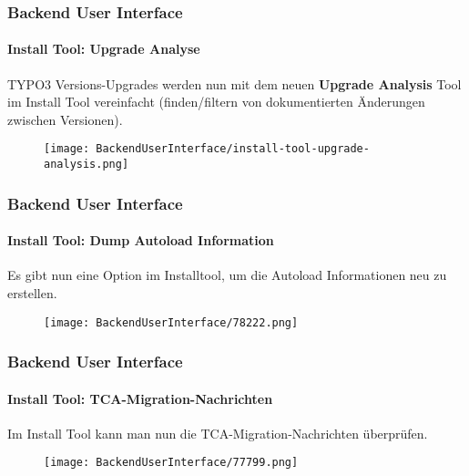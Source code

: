 \begin{frame}[fragile]
	\frametitle{Backend User Interface}
	\framesubtitle{Install Tool: Upgrade Analyse}

	TYPO3 Versions-Upgrades werden nun mit dem neuen  \textbf{Upgrade Analysis} Tool im Install Tool vereinfacht (finden/filtern von dokumentierten Änderungen zwischen Versionen).

	\begin{figure}
		\texttt{[image: BackendUserInterface/install-tool-upgrade-analysis.png]}
	\end{figure}

\end{frame}


\begin{frame}[fragile]
	\frametitle{Backend User Interface}
	\framesubtitle{Install Tool: Dump Autoload Information}

	Es gibt nun eine Option im Installtool, um die Autoload Informationen neu zu erstellen.

	\begin{figure}
		\texttt{[image: BackendUserInterface/78222.png]}
	\end{figure}

\end{frame}


\begin{frame}[fragile]
	\frametitle{Backend User Interface}
	\framesubtitle{Install Tool: TCA-Migration-Nachrichten}

	Im Install Tool kann man nun die TCA-Migration-Nachrichten überprüfen.

	\begin{figure}
		\texttt{[image: BackendUserInterface/77799.png]}
	\end{figure}

\end{frame}

